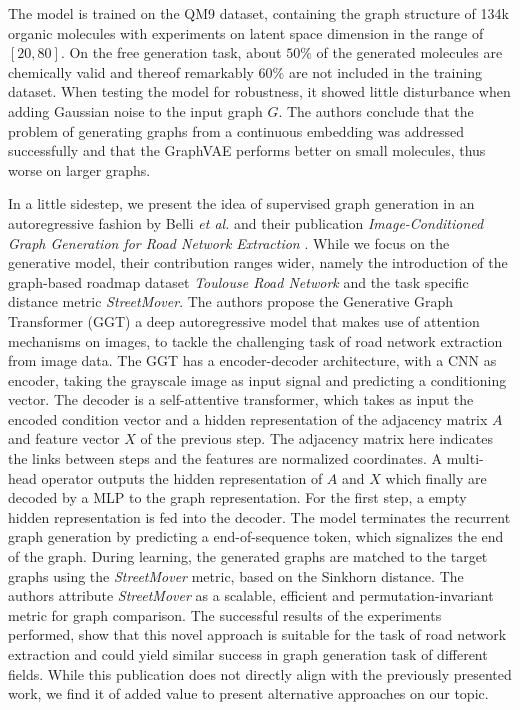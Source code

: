 The model is trained on the QM9 dataset, containing the graph structure of 134k organic molecules with experiments on latent space dimension in the range of $[20,80]$. On the free generation task, about $50\%$ of the generated molecules are chemically valid and thereof remarkably $60\%$ are not included in the training dataset. When testing the model for robustness, it showed little disturbance when adding Gaussian noise to the input graph $G$. The authors conclude that the problem of generating graphs
from a continuous embedding was addressed successfully and that the GraphVAE performs better on small molecules, thus worse on larger graphs.


In a little sidestep, we present the idea of supervised graph generation in an autoregressive fashion by Belli \textit{et al.} and their publication \textit{Image-Conditioned Graph Generation for Road Network Extraction} \cite{belli_image-conditioned_2019}. While we focus on the generative model, their contribution ranges wider, namely the introduction of the graph-based roadmap dataset \textit{Toulouse Road Network} and the task specific distance metric \textit{StreetMover}. The authors propose the Generative Graph Transformer (GGT) a deep autoregressive model that makes use of attention mechanisms on images, to tackle the challenging task of road network extraction from image data. The GGT has a encoder-decoder architecture, with a CNN as encoder, taking the grayscale image as input signal and predicting a conditioning vector. The decoder is a self-attentive transformer, which takes as input the encoded condition vector and a hidden representation of the adjacency matrix $A$ and feature vector $X$ of the previous step. The adjacency matrix here indicates the links between steps and the features are normalized coordinates. A multi-head operator outputs the hidden representation of $A$ and $X$ which finally are decoded by a MLP to the graph representation. For the first step, a empty hidden representation is fed into the decoder. The model terminates the recurrent graph generation by predicting a end-of-sequence token, which signalizes the end of the graph. During learning, the generated graphs are matched to the target graphs using the \textit{StreetMover} metric, based on the Sinkhorn distance. The authors attribute \textit{StreetMover} as a scalable, efficient and permutation-invariant metric for graph comparison. The successful results of the experiments performed, show that this novel approach is suitable for the task of road network extraction and could yield similar success in graph generation task of different fields.
While this publication does not directly align with the previously presented work, we find it of added value to present alternative approaches on our topic.

